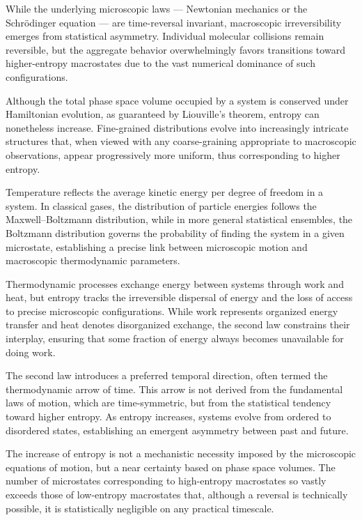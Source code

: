 While the underlying microscopic laws — Newtonian mechanics or the Schrödinger equation — are time-reversal invariant, macroscopic irreversibility emerges from statistical asymmetry. Individual molecular collisions remain reversible, but the aggregate behavior overwhelmingly favors transitions toward higher-entropy macrostates due to the vast numerical dominance of such configurations.

Although the total phase space volume occupied by a system is conserved under Hamiltonian evolution, as guaranteed by Liouville's theorem, entropy can nonetheless increase. Fine-grained distributions evolve into increasingly intricate structures that, when viewed with any coarse-graining appropriate to macroscopic observations, appear progressively more uniform, thus corresponding to higher entropy.

Temperature reflects the average kinetic energy per degree of freedom in a system. In classical gases, the distribution of particle energies follows the Maxwell–Boltzmann distribution, while in more general statistical ensembles, the Boltzmann distribution governs the probability of finding the system in a given microstate, establishing a precise link between microscopic motion and macroscopic thermodynamic parameters.

Thermodynamic processes exchange energy between systems through work and heat, but entropy tracks the irreversible dispersal of energy and the loss of access to precise microscopic configurations. While work represents organized energy transfer and heat denotes disorganized exchange, the second law constrains their interplay, ensuring that some fraction of energy always becomes unavailable for doing work.

The second law introduces a preferred temporal direction, often termed the thermodynamic arrow of time. This arrow is not derived from the fundamental laws of motion, which are time-symmetric, but from the statistical tendency toward higher entropy. As entropy increases, systems evolve from ordered to disordered states, establishing an emergent asymmetry between past and future.

The increase of entropy is not a mechanistic necessity imposed by the microscopic equations of motion, but a near certainty based on phase space volumes. The number of microstates corresponding to high-entropy macrostates so vastly exceeds those of low-entropy macrostates that, although a reversal is technically possible, it is statistically negligible on any practical timescale.

